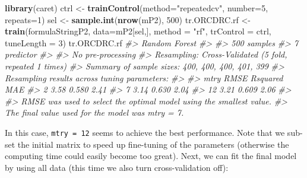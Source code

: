 \documentclass[graybox,natbib,nospthms,UStrade]{svmono}
\newenvironment{Shaded}{\begin{snugshade}}{\end{snugshade}}
\newcommand{\CommentTok}[1]{\textcolor[rgb]{0.37,0.37,0.37}{\textit{#1}}}
\newcommand{\DataTypeTok}[1]{\textcolor[rgb]{0.27,0.27,0.27}{#1}}
\newcommand{\DecValTok}[1]{\textcolor[rgb]{0.06,0.06,0.06}{#1}}
\newcommand{\KeywordTok}[1]{\textcolor[rgb]{0.27,0.27,0.27}{\textbf{#1}}}
\newcommand{\NormalTok}[1]{#1}
\newcommand{\OperatorTok}[1]{\textcolor[rgb]{0.43,0.43,0.43}{\textbf{#1}}}
\newcommand{\StringTok}[1]{\textcolor[rgb]{0.5,0.5,0.5}{#1}}
\begin{document}
\begin{Shaded}
\begin{Highlighting}[]
\KeywordTok{library}\NormalTok{(caret)}
\NormalTok{ctrl <-}\StringTok{ }\KeywordTok{trainControl}\NormalTok{(}\DataTypeTok{method=}\StringTok{"repeatedcv"}\NormalTok{, }\DataTypeTok{number=}\DecValTok{5}\NormalTok{, }\DataTypeTok{repeats=}\DecValTok{1}\NormalTok{)}
\NormalTok{sel <-}\StringTok{ }\KeywordTok{sample.int}\NormalTok{(}\KeywordTok{nrow}\NormalTok{(mP2), }\DecValTok{500}\NormalTok{)}
\NormalTok{tr.ORCDRC.rf <-}\StringTok{ }\KeywordTok{train}\NormalTok{(formulaStringP2, }\DataTypeTok{data=}\NormalTok{mP2[sel,], }
                      \DataTypeTok{method =} \StringTok{"rf"}\NormalTok{, }\DataTypeTok{trControl =}\NormalTok{ ctrl, }\DataTypeTok{tuneLength =} \DecValTok{3}\NormalTok{)}
\NormalTok{tr.ORCDRC.rf}
\CommentTok{#> Random Forest }
\CommentTok{#> }
\CommentTok{#> 500 samples}
\CommentTok{#>   7 predictor}
\CommentTok{#> }
\CommentTok{#> No pre-processing}
\CommentTok{#> Resampling: Cross-Validated (5 fold, repeated 1 times) }
\CommentTok{#> Summary of sample sizes: 400, 400, 400, 401, 399 }
\CommentTok{#> Resampling results across tuning parameters:}
\CommentTok{#> }
\CommentTok{#>   mtry  RMSE  Rsquared  MAE }
\CommentTok{#>    2    3.58  0.580     2.41}
\CommentTok{#>    7    3.14  0.630     2.04}
\CommentTok{#>   12    3.21  0.609     2.06}
\CommentTok{#> }
\CommentTok{#> RMSE was used to select the optimal model using the smallest value.}
\CommentTok{#> The final value used for the model was mtry = 7.}
\end{Highlighting}
\end{Shaded}

In this case, \texttt{mtry\ =\ 12} seems to achieve the best performance. Note that we sub-set the initial matrix to speed up fine-tuning of the parameters (otherwise the computing time could easily become too great). Next, we can fit the final model by using all data (this time we also turn cross-validation off):

\begin{Shaded}
\end{Shaded}
\end{document}
